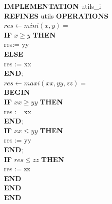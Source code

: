 \documentclass[10pt,a4paper]{article}
\begin{document}
{\noindent \textbf{IMPLEMENTATION}  utils\_i \\
\textbf{REFINES} utils
\textbf{OPERATIONS} \\
$res \leftarrow mini ( x , y ) =$ \\
\hspace*{1em}    \textbf{IF}  $x \geq y$ \textbf{THEN} \\
\hspace*{2em}        res:= yy \\
\hspace*{1em}    \textbf{ELSE} \\
\hspace*{2em}        res := xx \\
\hspace*{1em}    \textbf{END}; \\
$res \leftarrow maxi ( xx , yy , zz ) = $ \\
\hspace*{1em}    \textbf{BEGIN} \\
\hspace*{1em}    \textbf{IF} $xx \geq yy$ \textbf{THEN} \\
\hspace*{2em}        res := xx \\
\hspace*{1em}    \textbf{END}; \\
\hspace*{1em}   \textbf{IF} $xx \leq yy$  \textbf{THEN} \\
\hspace*{2em}        res := yy \\
\hspace*{1em}    \textbf{END}; \\
\hspace*{1em}   \textbf{IF} $res \leq zz$ \textbf{THEN} \\
\hspace*{2em}        res := zz \\
\hspace*{1em}    \textbf{END} \\
\hspace*{1em}    \textbf{END} \\
\textbf{END}

}
\end{document}
